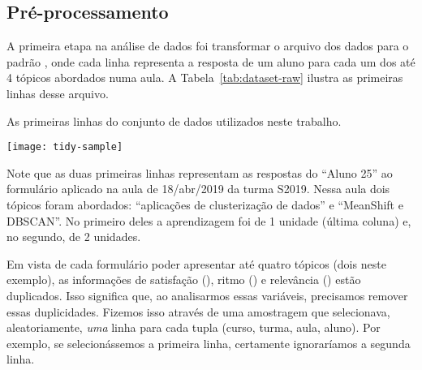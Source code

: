 \subsection{Pré-processamento}
\label{sec:pre-processamento}

A primeira etapa na análise de dados foi transformar o arquivo dos dados para o padrão  \cite{Wicham2014}, onde cada linha representa a resposta de um aluno para cada um dos até 4 tópicos abordados numa aula.
A Tabela~\ref{tab:dataset-raw} ilustra as primeiras linhas desse arquivo.

\begin{table}
	\centering
	\caption{As primeiras linhas do conjunto de dados utilizados neste trabalho.}
	\texttt{[image: tidy-sample]}
	\label{tab:dataset-raw}
\end{table}

Note que as duas primeiras linhas representam as respostas do ``Aluno 25'' ao formulário aplicado na aula de 18/abr/2019 da turma S2019. Nessa aula dois tópicos foram abordados: ``aplicações de clusterização de dados'' e ``MeanShift e DBSCAN''. No primeiro deles a aprendizagem foi de 1 unidade (última coluna) e, no segundo, de 2 unidades.

Em vista de cada formulário poder apresentar até quatro tópicos (dois neste exemplo), as informações de satisfação (), ritmo () e relevância () estão duplicados. Isso significa que, ao analisarmos essas variáveis, precisamos remover essas duplicidades.
Fizemos isso através de uma amostragem que selecionava, aleatoriamente, \emph{uma} linha para cada tupla (curso, turma, aula, aluno).
Por exemplo, se selecionássemos a primeira linha, certamente ignoraríamos a segunda linha.


